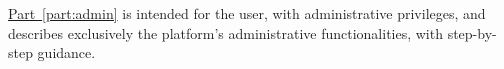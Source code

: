 	\hyperref[part:admin]{Part~\ref*{part:admin}} is intended for the \admin user, with administrative privileges, and describes exclusively the platform’s administrative functionalities, with step-by-step guidance.
	 
	
    \setlength{\parskip}{0.3em}
    \tableofcontents
    \setlength{\parskip}{0.8em}
    
    \thispagestyle{empty} 	%
    \clearpage              %
    \setcounter{page}{1}    %
    \pagestyle{plain}       %
    
    
    
    
   

